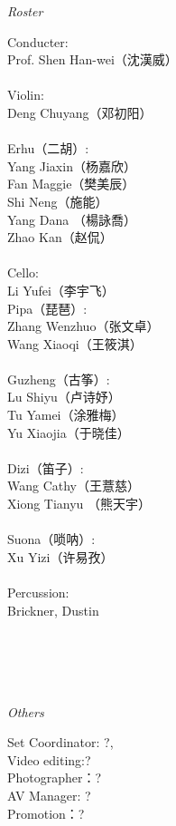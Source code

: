\documentclass[letter,8pt,poets]{ConcProg}
\begin{document}
\begin{spacing}{1.0}
\begin{center}
\Large\textsl{ Roster}
\end{center}
\begin{multicols}{2}%
\begin{spacing}{1.5}
Conducter:\\
Prof. Shen  Han-wei（沈漢威）
\\
\\
Violin:\\
Deng  Chuyang（邓初阳）\\
\\
Erhu（二胡）:     \\   
Yang  Jiaxin（杨嘉欣）\\  
Fan  Maggie（樊美辰）\\
Shi Neng（施能）\\
Yang  Dana （楊詠喬）\\
Zhao  Kan（赵侃）\\
\\
Cello:\\
Li  Yufei（李宇飞）\\

Pipa（琵琶）:\\
Zhang  Wenzhuo（张文卓）\\
Wang Xiaoqi（王筱淇）\\
\\
Guzheng（{古筝}）:\\
Lu  Shiyu（卢诗妤）\\
Tu  Yamei（涂雅梅）\\
Yu Xiaojia（于晓佳）
\\
\\
Dizi（笛子）: 				 \\
Wang  Cathy（王薏慈）\\
Xiong  Tianyu （熊天宇）\\
\\
Suona（唢呐）:\\
Xu  Yizi（许易孜）
\\
\\
Percussion:\\
Brickner, Dustin
\\
\\
\\
\\
\\
\end{spacing}
\end{multicols}
\begin{center}
\Large\textsl{ Others}
\end{center}
\begin{multicols}{2}%
 Set Coordinator: ?,\\ 
 Video editing:? \\
Photographer：?\\
AV Manager: ?\\
Promotion：?\\
\\



\end{multicols}
\end{spacing}
\end{document}
